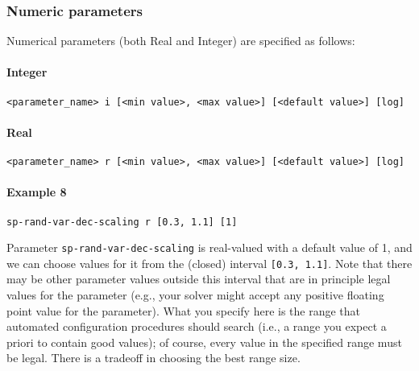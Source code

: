 \documentclass[manual.tex]{subfiles}
\begin{document}
\subsubsection*{Numeric parameters} \label{sec:numerical-params}
Numerical parameters (both Real and Integer) are specified as follows:

\paragraph{Integer}

\begin{verbatim}
<parameter_name> i [<min value>, <max value>] [<default value>] [log]
\end{verbatim}

\paragraph{Real}

\begin{verbatim}
<parameter_name> r [<min value>, <max value>] [<default value>] [log]
\end{verbatim}



\paragraph{Example 8}

\begin{verbatim}
sp-rand-var-dec-scaling r [0.3, 1.1] [1]
\end{verbatim}
Parameter \texttt{sp-rand-var-dec-scaling} is real-valued with a default value of 1, and we can choose values for it from the (closed) interval \texttt{[0.3, 1.1]}.
Note that there may be other parameter values outside this interval that are in principle legal values for the parameter (e.g., your solver might accept any positive floating point value for the parameter). What you specify here is the range that automated configuration procedures should search (i.e., a range you expect a priori to contain good values); of course, every value in the specified range must be legal. There is a tradeoff in choosing the best range size.%
\end{document}
